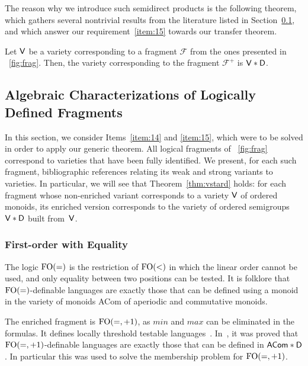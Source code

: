 \documentclass[a4paper,USenglish]{lipics}
\newcommand\Fs{\ensuremath{\mathcal{F}}\xspace}
\newcommand\Vbf{\ensuremath{{\sf V}}\xspace}
\newcommand\Dbf{\ensuremath{{\sf D}}\xspace}
\newcommand{\fow}{\ensuremath{\textup{FO}(<)}\xspace}
\newcommand{\foeq}{\ensuremath{\textup{FO}(=)}\xspace}
\newcommand{\foeqp}{\ensuremath{\textup{FO}(=,+1)}\xspace}
\theoremstyle{plain}
\begin{document}
The reason why we introduce such semidirect products is the following theorem,
which gathers several nontrivial results from the literature listed in
Section~\ref{sec:algebraic-charac}, and which answer our
requirement~\ref{item:15} towards our transfer theorem.

\begin{theorem}
  \label{thm:vstard}
  Let \Vbf be a variety corresponding to a fragment \Fs from the ones
  presented in \figurename~\ref{fig:frag}. Then, the variety corresponding to the
  fragment $\Fs^+$ is $\Vbf*\Dbf$.
\end{theorem}


\subsection{Algebraic Characterizations of Logically Defined Fragments}
\label{sec:algebraic-charac}


In this section, we consider Items~\ref{item:14} and \ref{item:15}, which were
to be solved in order to apply our generic theorem. All logical fragments of
\figurename~\ref{fig:frag} correspond to varieties that have been fully
identified.  We present, for each such fragment, bibliographic references
relating its weak and strong variants to varieties. In particular, we will see
that Theorem~\ref{thm:vstard} holds: for each fragment whose non-enriched
variant corresponds to a variety \Vbf of ordered monoids, its enriched version
corresponds to the variety of ordered semigroups $\Vbf * \Dbf$ built
from~$\Vbf$.

\subsubsection{First-order with Equality}
\label{sec:foeq}
The logic \foeq is the restriction of \fow in which the linear order cannot be
used, and only equality between two positions can be tested. It is folklore
that \foeq-definable languages are exactly those that can be defined using a
monoid in the variety of monoids {\sf ACom} of aperiodic and commutative
monoids.

The enriched fragment is $\foeqp$, as $min$ and $max$ can be
eliminated in the formulas. It defines locally threshold testable
languages~\cite{Thom82}. In~\cite{TherienWeiss:ltt-wreath:1985}, it was proved
that \foeqp-definable languages are exactly those that can be defined in
${\sf ACom} * \Dbf$. In particular this was used to solve the membership
problem for \foeqp.
\end{document}
